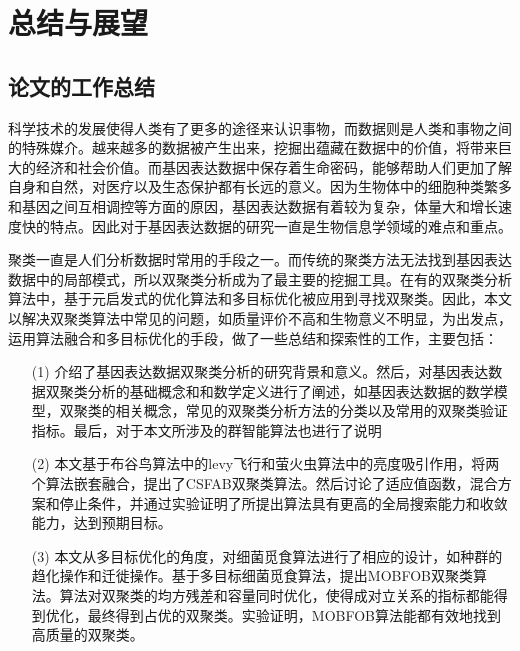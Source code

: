 \chapter{总结与展望}
\section{论文的工作总结}
科学技术的发展使得人类有了更多的途径来认识事物，而数据则是人类和事物之间的特殊媒介。越来越多的数据被产生出来，挖掘出蕴藏在数据中的价值，将带来巨大的经济和社会价值。而基因表达数据中保存着生命密码，能够帮助人们更加了解自身和自然，对医疗以及生态保护都有长远的意义。因为生物体中的细胞种类繁多和基因之间互相调控等方面的原因，基因表达数据有着较为复杂，体量大和增长速度快的特点。因此对于基因表达数据的研究一直是生物信息学领域的难点和重点。

聚类一直是人们分析数据时常用的手段之一。而传统的聚类方法无法找到基因表达数据中的局部模式，所以双聚类分析成为了最主要的挖掘工具。在有的双聚类分析算法中，基于元启发式的优化算法和多目标优化被应用到寻找双聚类。因此，本文以解决双聚类算法中常见的问题，如质量评价不高和生物意义不明显，为出发点，运用算法融合和多目标优化的手段，做了一些总结和探索性的工作，主要包括：
\begin{itemize}
    \item[(1)]{介绍了基因表达数据双聚类分析的研究背景和意义。然后，对基因表达数据双聚类分析的基础概念和和数学定义进行了阐述，如基因表达数据的数学模型，双聚类的相关概念，常见的双聚类分析方法的分类以及常用的双聚类验证指标。最后，对于本文所涉及的群智能算法也进行了说明}  

    \item[(2)]{本文基于布谷鸟算法中的levy飞行和萤火虫算法中的亮度吸引作用，将两个算法嵌套融合，提出了CSFAB双聚类算法。然后讨论了适应值函数，混合方案和停止条件，并通过实验证明了所提出算法具有更高的全局搜索能力和收敛能力，达到预期目标。}

    \item[(3)]{本文从多目标优化的角度，对细菌觅食算法进行了相应的设计，如种群的趋化操作和迁徙操作。基于多目标细菌觅食算法，提出MOBFOB双聚类算法。算法对双聚类的均方残差和容量同时优化，使得成对立关系的指标都能得到优化，最终得到占优的双聚类。实验证明，MOBFOB算法能都有效地找到高质量的双聚类。}
    
\end{itemize}
